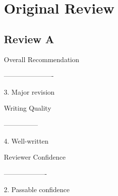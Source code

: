 \documentclass[letterpaper,onecolumn,10pt]{article}
\begin{document}
\section{Original Review}
\subsection{Review A}
Overall Recommendation

----------------------

3. Major revision

Writing Quality

---------------

4. Well-written

Reviewer Confidence

-------------------

2. Passable confidence
\end{document}

